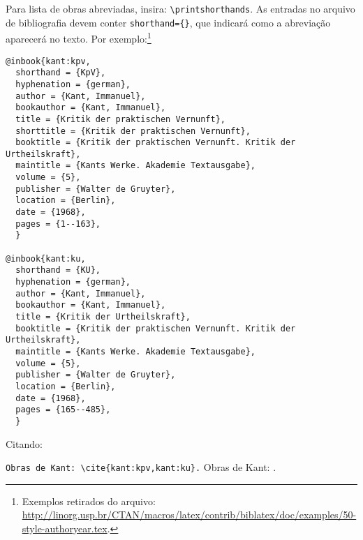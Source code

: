 Para lista de obras abreviadas, insira: \verb+\printshorthands+. As entradas no arquivo de bibliografia devem conter \verb+shorthand={}+, que indicará como a abreviação aparecerá no texto. Por exemplo:\footnote{Exemplos retirados do arquivo: \url{http://linorg.usp.br/CTAN/macros/latex/contrib/biblatex/doc/examples/50-style-authoryear.tex}.}

\begin{verbatim}
@inbook{kant:kpv,
  shorthand = {KpV},
  hyphenation = {german},
  author = {Kant, Immanuel},
  bookauthor = {Kant, Immanuel},
  title = {Kritik der praktischen Vernunft},
  shorttitle = {Kritik der praktischen Vernunft},
  booktitle = {Kritik der praktischen Vernunft. Kritik der Urtheilskraft},
  maintitle = {Kants Werke. Akademie Textausgabe},
  volume = {5},
  publisher = {Walter de Gruyter},
  location = {Berlin},
  date = {1968},
  pages = {1--163},
  }

@inbook{kant:ku,
  shorthand = {KU},
  hyphenation = {german},
  author = {Kant, Immanuel},
  bookauthor = {Kant, Immanuel},
  title = {Kritik der Urtheilskraft},
  booktitle = {Kritik der praktischen Vernunft. Kritik der Urtheilskraft},
  maintitle = {Kants Werke. Akademie Textausgabe},
  volume = {5},
  publisher = {Walter de Gruyter},
  location = {Berlin},
  date = {1968},
  pages = {165--485},
  }
\end{verbatim}

Citando:


\begin{center}
\verb+Obras de Kant: \cite{kant:kpv,kant:ku}.+
\qquad
Obras de Kant: \cite{kant:kpv,kant:ku}.
\end{center}

